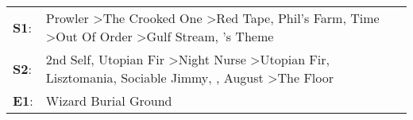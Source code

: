 \begin{supertabular}{p{0.03\textwidth}p{0.92\textwidth}}
 \textbf{S1}:  &                          Prowler\textsuperscript{} \textgreater \enspace The Crooked One\textsuperscript{} \textgreater \enspace Red Tape\textsuperscript{}, \enspace Phil's Farm\textsuperscript{}, \enspace Time\textsuperscript{} \textgreater \enspace Out Of Order\textsuperscript{} \textgreater \enspace Gulf Stream\textsuperscript{}, 's Theme\textsuperscript{}  \enspace  \\
 \textbf{S2}:  &  2nd Self\textsuperscript{}, \enspace Utopian Fir\textsuperscript{} \textgreater \enspace Night Nurse\textsuperscript{} \textgreater \enspace Utopian Fir\textsuperscript{}, \enspace Lisztomania\textsuperscript{}, \enspace Sociable Jimmy\textsuperscript{}, \textsuperscript{}, \enspace August\textsuperscript{} \textgreater \enspace The Floor\textsuperscript{}  \enspace  \\
 \textbf{E1}:  &                                                                                                                                                                                                                                                                                                                                               Wizard Burial Ground\textsuperscript{}  \enspace  \\
\end{supertabular}
